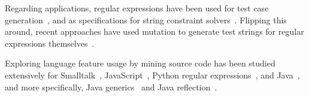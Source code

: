 Regarding applications, regular expressions have been used for test case generation~\cite{Ghosh:2013:JAT:2486788.2486925, Galler:2014:STD:2683035.2683100, Anand:2013:OSM:2503903.2503991, Tillmann:2014:TAT:2642937.2642941}, and
as specifications for string constraint solvers~\cite{Trinh:2014:SSS:2660267.2660372, hampi}.
Flipping this around, recent approaches have used mutation to generate test strings for regular expressions themselves~\cite{7899040}. 

Exploring language feature usage by mining source code has been studied extensively for
Smalltalk~\cite{Callau:2011:DUD:1985441.1985448},
JavaScript~\cite{Richards:2010:ADB:1809028.1806598},
Python regular expressions~\cite{chapman2016},
and Java~\cite{Dyer:2014:MBA:2568225.2568295, Grechanik:2010:EIL:1852786.1852801, Parnin:2013:AUJ:2589712.2589717, Livshits:2005:RAJ:2099708.2099724},
and more specifically,
Java generics~\cite{Parnin:2013:AUJ:2589712.2589717} and
Java reflection~\cite{Livshits:2005:RAJ:2099708.2099724}.




%
%
%
%

%
%
%
%
%

%

